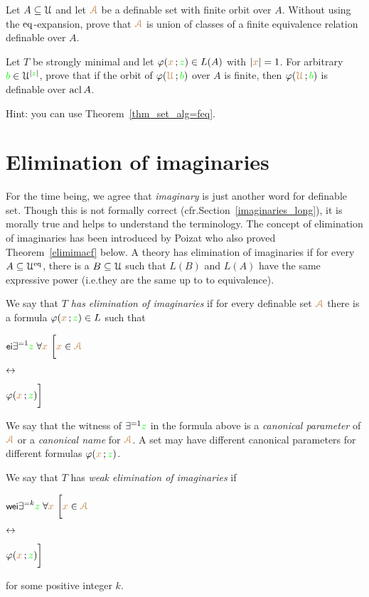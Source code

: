 \documentclass[creche.tex]{subfiles}
\begin{document}
\begin{exercise}\label{ex_feqthm_senza_eq}
Let $A\subseteq\EuScript U$ and let ${\color{brown}\EuScript A}$ be a definable set with finite orbit over $A$.
Without using the ${{\rm eq}}$-expansion, prove that ${\color{brown}\EuScript A}$ is union of classes of a finite equivalence relation definable over $A$.\QED
\end{exercise}

\begin{exercise}
Let $T$ be strongly minimal and let $\varphi({\color{brown} x}\,;{\color{green} z})\in L(A)$ with $|{\color{brown} x}|=1$.
For arbitrary ${\color{green} b}\in\EuScript U^{|{\color{green} z}|}$, prove that if the orbit of $\varphi({\color{brown}\EuScript U}\,; {\color{green} b})$ over $A$ is finite, then $\varphi({\color{brown}\EuScript U}\,; {\color{green} b})$ is definable over $\mathop{\rm acl} A$.

Hint: you can use Theorem~\ref{thm_set_alg=feq}.\QED
\end{exercise}


\section{Elimination of imaginaries}\label{elimination_imaginaries}

\def\medrel#1{\parbox[t]{5ex}{$\displaystyle\hfil #1$}}
\def\ceq#1#2#3{\parbox[t]{30ex}{$\displaystyle #1$}\medrel{#2}{$\displaystyle #3$}}

For the time being, we agree that \textit{imaginary\/} is just another word for definable set.
Though this is not formally correct (cfr.\@ Section~\ref{imaginaries_long}), it is morally true and helps to understand the terminology.
The concept of elimination of imaginaries has been introduced by Poizat who also proved Theorem~\ref{elimimacf} below.
A theory has elimination of imaginaries if for every $A\subseteq\EuScript U^{{\rm eq}}$, there is a $B\subseteq\EuScript U$ such that $L(B)$ and $L(A)$ have the same expressive power (i.e.\@ they are the same up to to equivalence).


\begin{definition}\label{defelimanazioneimmaginari}
We say that \emph{$T$ has elimination of imaginaries\/} if for every definable set ${\color{brown}\EuScript A}$ there is a formula $\varphi({\color{brown} x}\,;{\color{green} z})\in L$ such that\smallskip

\ceq{\ssf{ei}\hfill\E^{=1} {\gr z}\;\A {\mr x}\ \bigg[{\mr x}\in{\vl\Aa}}{\iff}{\phi({\mr x}\,;{\gr z})\bigg]}

We say that the witness of $\exists^{=1}{\color{green} z}$ in the formula above is a \emph{canonical parameter\/} of ${\color{brown}\EuScript A}$ or a \emph{canonical name\/} for ${\color{brown}\EuScript A}$.
A set may have different canonical parameters for different formulas $\varphi({\color{brown} x}\,;{\color{green} z})$.

We say that $T$ has \emph{weak elimination of imaginaries\/} if\smallskip

\ceq{\ssf{wei}\hfill\E^{=k} {\gr z}\;\A {\mr x}\ \bigg[{\mr x}\in{\vl\Aa}}{\iff}{\phi({\mr x}\,;{\gr z})\bigg]}

for some positive integer $k$.\QED
\end{definition}
\end{document}
